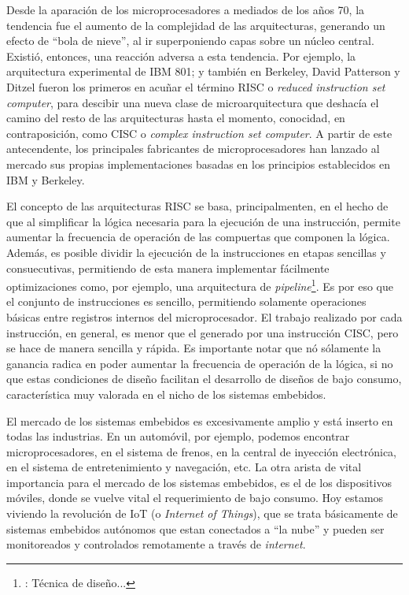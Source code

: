 \documentclass[a4paper]{article}
\begin{document}
Desde la aparación de los microprocesadores a mediados de los años 70, la tendencia fue el aumento de la complejidad de las arquitecturas, generando un efecto de ``bola de nieve'', al ir superponiendo capas sobre un núcleo central. Existió, entonces, una reacción adversa a esta tendencia. Por ejemplo, la arquitectura experimental de IBM 801; y también en Berkeley, David Patterson y Ditzel fueron los primeros en acuñar el término RISC o \emph{reduced instruction set computer}, para descibir una nueva clase de microarquitectura que deshacía el camino del resto de las arquitecturas hasta el momento, conocidad, en contraposición, como CISC o \emph{complex instruction set computer}. A partir de este antecendente, los principales fabricantes de microprocesadores han lanzado al mercado sus propias implementaciones basadas en los principios establecidos en IBM y Berkeley.

El concepto de las arquitecturas RISC se basa, principalmenten, en el hecho de que al simplificar la lógica necesaria para la ejecución de una instrucción, permite aumentar la frecuencia de operación de las compuertas que componen la lógica. Además, es posible dividir la ejecución de la instrucciones en etapas sencillas y consuecutivas, permitiendo de esta manera implementar fácilmente optimizaciones como, por ejemplo, una arquitectura de \emph{pipeline}\footnote{\label{Pipeline}: Técnica de diseño...}. Es por eso que el conjunto de instrucciones es sencillo, permitiendo solamente operaciones básicas entre registros internos del microprocesador. El trabajo realizado por cada instrucción, en general, es menor que el generado por una instrucción CISC, pero se hace de manera sencilla y rápida. Es importante notar que nó sólamente la ganancia radica en poder aumentar la frecuencia de operación de la lógica, si no que estas condiciones de diseño facilitan el desarrollo de diseños de bajo consumo, característica muy valorada en el nicho de los sistemas embebidos.

El mercado de los sistemas embebidos es excesivamente amplio y está inserto en todas las industrias. En un automóvil, por ejemplo, podemos encontrar microprocesadores, en el sistema de frenos, en la central de inyección electrónica, en el sistema de entretenimiento y navegación, etc. La otra arista de vital importancia para el mercado de los sistemas embebidos, es el de los dispositivos móviles, donde se vuelve vital el requerimiento de bajo consumo. Hoy estamos viviendo la revolución de IoT (o \emph{Internet of Things}), que se trata básicamente de sistemas embebidos autónomos que estan conectados a ``la nube'' y pueden ser monitoreados y controlados remotamente a través de \emph{internet}.
\end{document}
